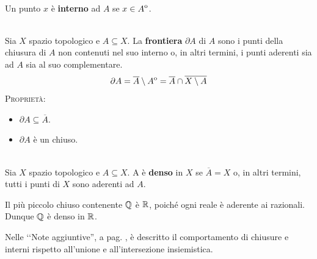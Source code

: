 \begin{define}~{}\\
	Un punto $x$ è \textbf{interno} ad $A$ se $x\in{\kern0ptA}^{\mathrm{o}}$.
\end{define}
\begin{define}[Frontiera.]~{}\\
Sia $X$ spazio topologico e $A\subseteq X$. La \textbf{frontiera} $\partial A$ di $A$ sono i punti della chiusura di $A$ non contenuti nel suo interno o, in altri termini, i punti aderenti sia ad $A$ sia al suo complementare.
\begin{equation}
\partial A=\overline{A}\setminus {\kern0ptA}^{\mathrm{o}}=\overline{A}\cap\overline{X\setminus A}
\end{equation}
\textsc{Proprietà:}
\begin{itemize}
	\item $\partial{A}\subseteq \overline{A}$.
	\item $\partial{A}$ è un chiuso.
\end{itemize}
\vspace{-3mm}
\end{define}
\begin{define}~{}\\
Sia $X$ spazio topologico e $A\subseteq X$. A è \textbf{denso} in $X$ se $\overline{A}=X$ o, in altri termini, tutti i punti di $X$ sono aderenti ad $A$.
\end{define}
\begin{example}
Il più piccolo chiuso contenente $\mathbb{Q}$ è $\mathbb{R}$, poiché ogni reale è aderente ai razionali. Dunque $\mathbb{Q}$ è denso in $\mathbb{R}$.
\end{example}
Nelle ‘‘Note aggiuntive'', a pag. \pageref{chiusurainterno}, è descritto il comportamento di chiusure e interni rispetto all'unione e all'intersezione insiemistica.
